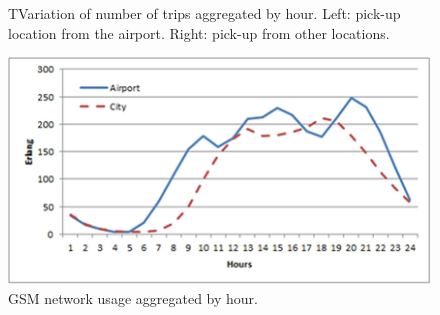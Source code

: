 \documentclass[a4paper, 10pt, conference]{ieeeconf}      %
\begin{document}
\begin{figure}[htbp]
    \centering

    \caption{ TVariation of number of trips aggregated by hour. Left:  pick-up location from the airport. Right: pick-up from other locations. }
    \label{fig:my_png_7}
\end{figure}

\begin{figure}[htbp]
    \centering
    \includegraphics{fig/png8.png}
    \caption{GSM network usage aggregated by hour. }
    \label{fig:my_png_8}
\end{figure}

\end{document}
